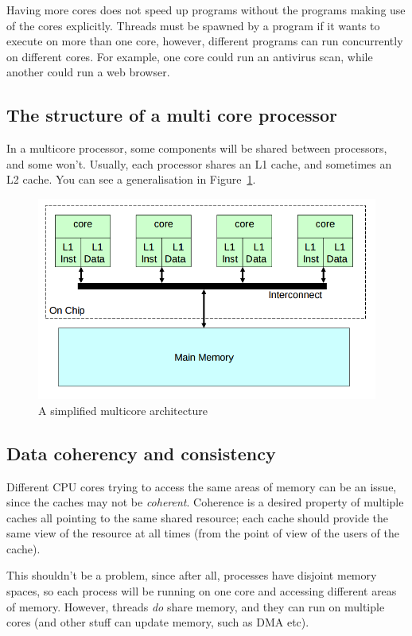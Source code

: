 Having more cores does not speed up programs without the programs making use of
the cores explicitly. Threads must be spawned by a program if it wants to
execute on more than one core, however, different programs can run concurrently
on different cores. For example, one core could run an antivirus scan, while
another could run a web browser.

\subsection{The structure of a multi core processor}

In a multicore processor, some components will be shared between processors, and
some won't. Usually, each processor shares an L1 cache, and sometimes an L2
cache. You can see a generalisation in Figure~\ref{multicore-arch}.

\begin{figure}
  \includegraphics[width=\textwidth]{images/multicore-arch}
  \caption{A simplified multicore architecture}
  \label{multicore-arch}
\end{figure}

\subsection{Data coherency and consistency}

Different CPU cores trying to access the same areas of memory can be an issue,
since the caches may not be \textit{coherent}. Coherence is a desired property
of multiple caches all pointing to the same shared resource; each cache should
provide the same view of the resource at all times (from the point of view of
the users of the cache).

This shouldn't be a problem, since after all, processes have disjoint memory
spaces, so each process will be running on one core and accessing different
areas of memory. However, threads \textit{do} share memory, and they can run on
multiple cores (and other stuff can update memory, such as DMA etc).

